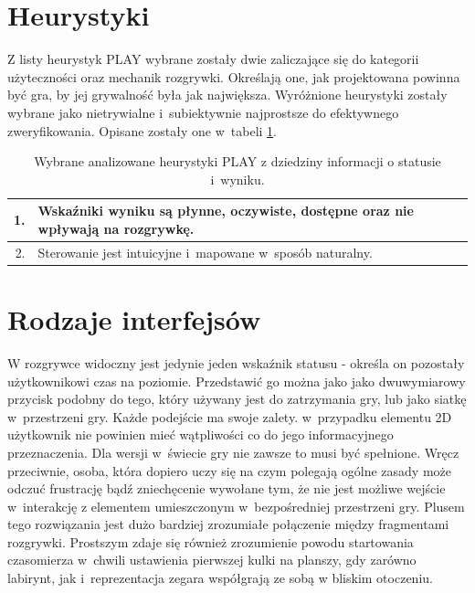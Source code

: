 \documentclass[a4paper,12pt,numbers=noenddot]{report}
\begin{document}
\section{Heurystyki}
Z listy heurystyk PLAY \cite{ArticlePLAY} wybrane zostały dwie zaliczające się do kategorii użyteczności oraz mechanik rozgrywki. Określają one, jak projektowana powinna być gra, by jej grywalność była jak największa. Wyróżnione heurystyki zostały wybrane jako nietrywialne i~subiektywnie najprostsze do efektywnego zweryfikowania. Opisane zostały one w~tabeli \ref{tab:tab1}.

\begin{table}[h!]
  \centering
  \caption{Wybrane analizowane heurystyki PLAY z dziedziny informacji o statusie i~wyniku.}
  \label{tab:tab1}
  \begin{tabular}{|r|l|}
    \hline
    1. & Wskaźniki wyniku są płynne, oczywiste, dostępne oraz nie wpływają na rozgrywkę.\\
    \hline
    2. & Sterowanie jest intuicyjne i~mapowane w~sposób naturalny.\\
    \hline
  \end{tabular}
\end{table}

\section{Rodzaje interfejsów}
W rozgrywce widoczny jest jedynie jeden wskaźnik statusu - określa on pozostały użytkownikowi czas na poziomie. Przedstawić go można jako jako dwuwymiarowy przycisk podobny do tego, który używany jest do zatrzymania gry, lub jako siatkę w~przestrzeni gry. Każde podejście ma swoje zalety. w~przypadku elementu 2D użytkownik nie powinien mieć wątpliwości co do jego informacyjnego przeznaczenia. Dla wersji w~świecie gry nie zawsze to musi być spełnione. Wręcz przeciwnie, osoba, która dopiero uczy się na czym polegają ogólne zasady może odczuć frustrację bądź zniechęcenie wywołane tym, że nie jest możliwe wejście w~interakcję z elementem umieszczonym w~bezpośredniej przestrzeni gry. Plusem tego rozwiązania jest dużo bardziej zrozumiałe połączenie między fragmentami rozgrywki. Prostszym zdaje się również zrozumienie powodu startowania czasomierza w~chwili ustawienia pierwszej kulki na planszy, gdy zarówno labirynt, jak i~reprezentacja zegara współgrają ze sobą w bliskim otoczeniu.
\end{document}
